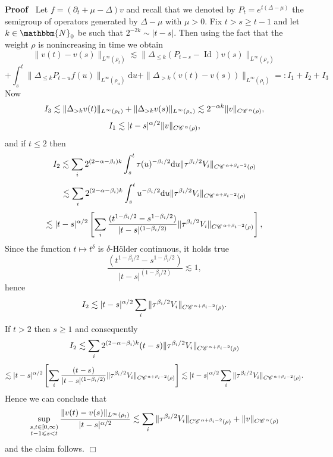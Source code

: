\documentclass[a4paper,11pt]{article}
\renewcommand{\leq}{\leqslant}
\renewcommand{\geq}{\geqslant}
\newcommand{\backassign}{=:}
\newcommand{\mathd}{\mathrm{d}}
\newcommand{\tmop}[1]{\ensuremath{\operatorname{#1}}}
\newenvironment{proof}{\noindent\textbf{Proof\ }}{\hspace*{\fill}$\Box$\medskip}
\numberwithin{equation}{section}
\newcommand{\CC}{\mathscr{C} \hspace{.1em}}
\newcommand{\8}{\infty}
\begin{document}
\begin{proof}
  Let $f = (\partial_t + \mu - \Delta) v$ and recall that we denoted by $P_{t}=e^{t(\Delta-\mu)}$ the  semigroup of operators generated by $\Delta-\mu$ with $\mu>0$. Fix $t>s \geqslant t-1$ and let $k \in \mathbbm{N}_0$ be such that $2^{- 2 k} \sim | t
  - s |$. Then using the fact that the weight $\rho$ is nonincreasing in time we obtain
  \[ \|v (t) - v (s) \|_{L^{\infty} (\rho_{t})} \lesssim \| \Delta_{\leqslant k}
     (P_{t - s} - \tmop{Id}) v (s) \|_{L^{\infty} (\rho_{s})} \]
  \[ + \int_s^t \| \Delta_{\leqslant k} P_{t - u} f (u) \|_{L^{\infty} (\rho_{u})}
     \mathd u +  \|\Delta_{>k} (v(t)-v(s)) \|_{ L^{\infty} (\rho_{t})} \backassign I_1
     + I_2 + I_3 \]
  Now
  $$
  I_{3}\lesssim \|\Delta_{>k}v(t) \|_{L^{\infty} (\rho_{t})} +\|\Delta_{>k}v(s) \|_{L^{\infty} (\rho_{s})} \lesssim 2^{- \alpha k} \| v \|_{C \CC^{\alpha} (\rho)},
  $$
  \[ I_1 \lesssim | t - s |^{\alpha / 2} \| v \|_{C \CC^{\alpha} (\rho)}, \]
  and if $t\le 2$ then
  \[ I_2 \lesssim \sum_i 2^{(2 - \alpha - \beta_i) k} \int_s^t \tau (u)^{-
     \beta_i / 2} \mathd u \| \tau^{\beta_i / 2} V_i \|_{C \CC^{\alpha +
     \beta_i - 2} (\rho)} \]
  \[ \lesssim \sum_i 2^{(2 - \alpha - \beta_i) k} 
     \int_s^t u^{- \beta_i / 2} \mathd u \| \tau^{\beta_i / 2} V_i \|_{C
     \CC^{\alpha + \beta_i - 2} (\rho)} \]
  \[ \lesssim | t - s |^{\alpha / 2} \left[ \sum_i \frac{(t^{1 - \beta_i / 2}
     - s^{1 - \beta_i / 2})}{| t - s |^{(1 - \beta_i / 2)}} \| \tau^{\beta_i /
     2} V_i \|_{C \CC^{\alpha + \beta_i - 2} (\rho)} \right], \]
Since the function $t\mapsto t^{\delta}$ is $\delta$-H\"older continuous, it holds true
  \[ \frac{(t^{1 - \beta_i / 2} - s^{1 - \beta_i / 2})}{| t - s |^{(1 -
     \beta_i / 2)}} \lesssim 1, \]
  hence
  \[ I_2 \lesssim | t - s |^{\alpha / 2} \sum_i \| \tau^{\beta_i / 2} V_i
     \|_{C \CC^{\alpha + \beta_i - 2} (\rho)} . \]
  If $t>2$ then $s\geq 1$ and consequently
  \[ I_2 \lesssim \sum_i 2^{(2 - \alpha - \beta_i) k} (t - s) \| \tau^{\beta_i
     / 2} V_i \|_{C \CC^{\alpha + \beta_i - 2} (\rho)} \]
  \[ \lesssim | t - s |^{\alpha / 2} \left[ \sum_i \frac{(t^{} - s^{})}{| t -
     s |^{(1 - \beta_i / 2)}} \| \tau^{\beta_i / 2} V_i \|_{C \CC^{\alpha +
     \beta_i - 2} (\rho)} \right] \lesssim | t - s |^{\alpha / 2} \sum_i \|
     \tau^{\beta_i / 2} V_i \|_{C \CC^{\alpha + \beta_i - 2} (\rho)} . \]
Hence we can conclude that
  \[ \sup_{\substack{s,t\in [0,\8)\\t-1\leq s < t}} \frac{\|v (t) - v (s) \|_{L^{\infty} (\rho_{t})}}{| t - s
     |^{\alpha / 2}} \lesssim \sum_i \| \tau^{\beta_i / 2} V_i \|_{C
     \CC^{\alpha + \beta_i - 2} (\rho)} + \| v \|_{C \CC^{\alpha} (\rho)} \]
and the claim follows.
\end{proof}
\end{document}
